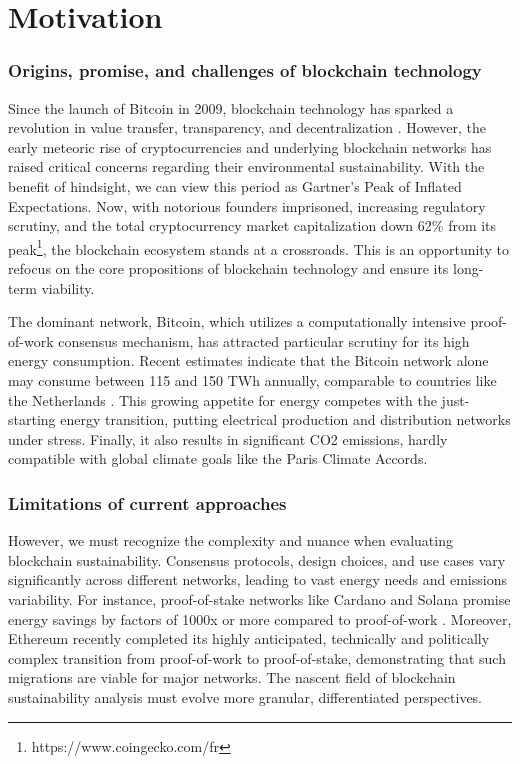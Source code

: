 \documentclass[11pt]{report}
\begin{document}
\section{Motivation}
\subsubsection*{Origins, promise, and challenges of blockchain technology}
Since the launch of Bitcoin in 2009, blockchain technology has sparked a revolution in value transfer, transparency, and decentralization \cite{nakamotoBitcoinPeertopeerElectronic2008}. However, the early meteoric rise of cryptocurrencies and underlying blockchain networks has raised critical concerns regarding their environmental sustainability. With the benefit of hindsight, we can view this period as Gartner's Peak of Inflated Expectations. Now, with notorious founders imprisoned, increasing regulatory scrutiny, and the total cryptocurrency market capitalization down
62\% from its peak\footnote{https://www.coingecko.com/fr}, the blockchain ecosystem stands at a crossroads. This is an opportunity to refocus on the core propositions of blockchain technology and ensure its long-term viability.


The dominant network, Bitcoin, which utilizes a computationally intensive proof-of-work consensus mechanism, has attracted particular scrutiny for its high energy consumption. Recent estimates indicate that the Bitcoin network alone may consume between 115 and 150 TWh annually, comparable to countries like the Netherlands \cite{devriesRevisitingBitcoinCarbon2022,neumuellerCambridgeBitcoinElectricity2021}. This growing appetite for energy competes with the just-starting energy transition, putting electrical production and distribution networks under stress. Finally, it also results in significant CO2 emissions, hardly compatible with global climate goals like the Paris Climate Accords.

\subsubsection*{Limitations of current approaches}
However, we must recognize the complexity and nuance when evaluating blockchain sustainability. Consensus protocols, design choices, and use cases vary significantly across different networks, leading to vast energy needs and emissions variability. For instance, proof-of-stake networks like Cardano and Solana promise energy savings by factors of 1000x or more compared to proof-of-work \cite{kohliAnalysisEnergyConsumption2023}. Moreover, Ethereum recently completed its highly anticipated, technically and politically complex transition from proof-of-work to proof-of-stake, demonstrating that such migrations are viable for major networks. \cite{bloombergnewsEthereumMergeYour2022} The nascent field of blockchain sustainability analysis must evolve more granular, differentiated perspectives.
\end{document}
